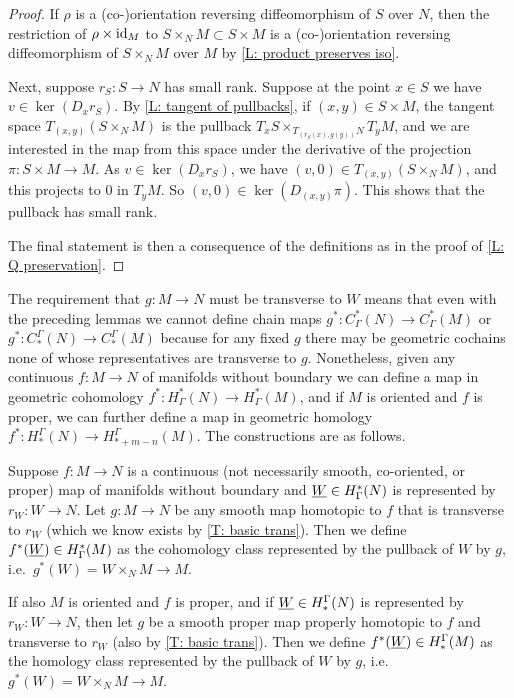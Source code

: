 \begin{proof}
	If $\rho$ is a (co\nobreakdash-)orientation reversing diffeomorphism of $S$ over $N$, then the restriction of $\rho \times \mathrm{id}_M$ to $S \times_N M \subset S \times M$ is a (co\nobreakdash-)orientation reversing diffeomorphism of $S \times_N M$ over $M$ by \cref{L: product preserves iso}.

	Next, suppose $r_S \colon S \to N$ has small rank.
	Suppose at the point $x \in S$ we have $v \in \ker(D_x r_S)$.
	By \cref{L: tangent of pullbacks}, if $(x,y) \in S \times M$, the tangent space $T_{(x,y)}(S \times_N M)$ is the pullback $T_xS\times_{T_{(r_S(x),g(y))}N} T_y M$, and we are interested in the map from this space under the derivative of the projection $\pi \colon S \times M \to M$.
	As $v \in \ker (D_xr_S)$, we have $(v,0) \in T_{(x,y)}(S \times_N M)$, and this projects to $0$ in $T_yM$.
	So $(v,0) \in \ker(D_{(x,y)}\pi)$.
	This shows that the pullback has small rank.

	The final statement is then a consequence of the definitions as in the proof of \cref{L: Q preservation}.
\end{proof}

The requirement that $g \colon M \to N$ must be transverse to $W$ means that even with the preceding lemmas we cannot define chain maps $g^* \colon C^*_\Gamma(N) \to C^*_\Gamma(M)$ or $g^* \colon C_*^\Gamma(N) \to C_*^\Gamma(M)$ because for any fixed $g$ there may be geometric cochains none of whose representatives are transverse to $g$.
Nonetheless, given any continuous $f \colon M \to N$ of manifolds without boundary we can define a map in geometric cohomology $f^* \colon H^*_\Gamma(N) \to H^*_\Gamma(M)$, and if $M$ is oriented and $f$ is proper, we can further define a map in geometric homology $f^* \colon H_*^\Gamma(N) \to H_{*+m-n}^\Gamma(M)$.
The constructions are as follows.

\begin{definition}\label{D: cohomology pullback and homology transfer}
	Suppose $f \colon M \to N$ is a continuous (not necessarily smooth, co-oriented, or proper) map of manifolds without boundary and $\underline{W} \in H^*_\Gamma(N)$ is represented by $r_W \colon W \to N$.
	Let $g \colon M \to N$ be any smooth map homotopic to $f$ that is transverse to $r_W$ (which we know exists by \cref{T: basic trans}).
	Then we define $f^*(\underline{W}) \in H^*_\Gamma(M)$ as the cohomology class represented by the pullback of $W$ by $g$, i.e.\ $g^*(W) = W \times_N M \to M$.

	If also $M$ is oriented and $f$ is proper, and if $\underline{W} \in H_*^\Gamma(N)$ is represented by $r_W \colon W \to N$, then let $g$ be a smooth proper map properly homotopic to $f$ and transverse to $r_W$ (also by \cref{T: basic trans}).
	Then we define $f^*(\underline{W}) \in H_*^\Gamma(M)$ as the homology class represented by the pullback of $W$ by $g$, i.e.\ $g^*(W) = W \times_N M \to M$.
\end{definition}

